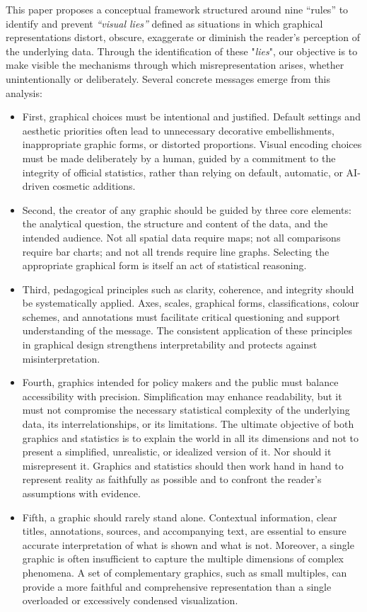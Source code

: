 \documentclass[11pt,twoside,a4paper]{article}
\begin{document}
This paper proposes a conceptual framework structured around nine “rules” to identify and prevent  \textit{``visual lies''} defined as situations in which graphical representations distort, obscure, exaggerate or diminish the reader's perception of the underlying data. Through the identification of these "\textit{lies}", our objective is to make visible the mechanisms through which misrepresentation arises, whether unintentionally or deliberately. Several concrete messages emerge from this analysis: 
\begin{itemize}
    \item First, graphical choices must be intentional and justified. Default settings and aesthetic priorities often lead to unnecessary decorative embellishments, inappropriate graphic forms, or distorted proportions. Visual encoding choices must be made deliberately by a human, guided by a commitment to the integrity of official statistics, rather than relying on default, automatic, or AI-driven cosmetic additions. 
    
    \item Second, the creator of any graphic should be guided by three core elements: the analytical question, the structure and content of the data, and the intended audience. Not all spatial data require maps; not all comparisons require bar charts; and not all trends require line graphs. Selecting the appropriate graphical form is itself an act of statistical reasoning.

    \item Third, pedagogical principles such as clarity, coherence, and integrity should be systematically applied. Axes, scales, graphical forms, classifications, colour schemes, and annotations must facilitate critical questioning and support understanding of the message. The consistent application of these principles in graphical design strengthens interpretability and protects against misinterpretation.

    \item Fourth, graphics intended for policy makers and the public must balance accessibility with precision. Simplification may enhance readability, but it must not compromise the necessary statistical complexity of the underlying data, its interrelationships, or its limitations. The ultimate objective of both graphics and statistics is to explain the world in all its dimensions and not to present a simplified, unrealistic, or idealized version of it. Nor should it misrepresent it. Graphics and statistics should then work hand in hand to represent reality as faithfully as possible and to confront the reader's assumptions with evidence.

    \item Fifth, a graphic should rarely stand alone. Contextual information, clear titles, annotations, sources, and accompanying text, are essential to ensure accurate interpretation of what is shown and what is not. Moreover, a single graphic is often insufficient to capture the multiple dimensions of complex phenomena. A set of complementary graphics, such as small multiples, can provide a more faithful and comprehensive representation than a single overloaded or excessively condensed visualization. 
\end{itemize}
\end{document}
